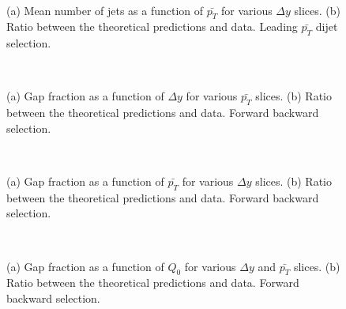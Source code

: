 \begin{figure}
\centering
\mbox{
              \quad
              \quad
}
\caption[Mean number of jets as a function of $\bar{p_T}$ for leading $p_T$ dijet selection]{ (a) Mean number of jets as a function of $\bar{p_T}$ for various $\Delta y$ slices. (b) Ratio between the theoretical predictions and data. Leading $\bar{p_T}$ dijet selection.
\label{GBJ1:NjetspTSelA}}
\end{figure}


\begin{figure}
\centering
\mbox{
              \quad
              \quad
}
\caption[Gap fraction as a function of $\Delta y$ for forward backward selection]{ (a) Gap fraction as a function of $\Delta y$ for various $\bar{p_T}$ slices. (b) Ratio between the theoretical predictions and data. Forward backward selection.
\label{GBJ1:dYSelB}}
\end{figure}

\begin{figure}
\centering
\mbox{
              \quad
              \quad
}
\caption[Gap fraction as a function of $\bar{p_T}$ for forward backward selection]{ (a) Gap fraction as a function of $\bar{p_T}$ for various $\Delta y$ slices. (b) Ratio between the theoretical predictions and data. Forward backward selection.
\label{GBJ1:pTSelB}}
\end{figure}

\begin{figure}
\centering
\mbox{
              \quad
              \quad
}
\caption[Gap fraction as a function of $Q_0$ for forward backward selection]{ (a) Gap fraction as a function of $Q_0$ for various $\Delta y$ and $\bar{p_T}$ slices. (b) Ratio between the theoretical predictions and data. Forward backward selection.
\label{GBJ1:Q0SelB}}
\end{figure}


